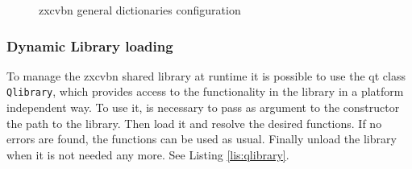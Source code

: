 \begin{figure}[ht]
  \centering
  \caption{zxcvbn general dictionaries configuration}
 \label{fig:zxcvbnGen}
\end{figure}

\subsubsection*{Dynamic Library loading}

To manage the zxcvbn shared library at runtime it is possible to use the qt class \texttt{Qlibrary}, which provides access to the functionality in the library in a platform independent way. To use it, is necessary to pass as argument to the constructor the path to the library. Then load it and resolve the desired functions. If no errors are found, the functions can be used as usual. Finally unload the library when it is not needed any more. See Listing \ref{lis:qlibrary}.


